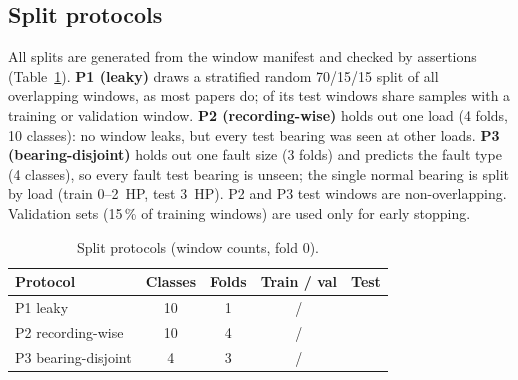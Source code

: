 \documentclass[conference]{IEEEtran}
\begin{document}
\subsection{Split protocols}
All splits are generated from the window manifest and checked by assertions (Table~\ref{tab:splits}).
\textbf{P1 (leaky)} draws a stratified random 70/15/15 split of all overlapping windows, as most papers do;
\NumPOneLeakPct{} of its test windows share samples with a training or validation window. \textbf{P2 (recording-wise)} holds out one
load (4 folds, 10 classes): no window leaks, but every test bearing was seen at other loads. \textbf{P3
(bearing-disjoint)} holds out one fault size (3 folds) and predicts the fault type (4 classes), so every fault test
bearing is unseen; the single normal bearing is split by load (train 0--2~HP, test 3~HP). P2 and P3 test windows are
non-overlapping. Validation sets (15\,\% of training windows) are used only for early stopping.

\begin{table}[t]
\centering
\caption{Split protocols (window counts, fold 0).}
\label{tab:splits}
\begin{tabular}{lcccc}
\toprule
Protocol & Classes & Folds & Train / val & Test \\
\midrule
P1 leaky & 10 & 1 & \NumPOneTrain{} / \NumPOneVal{} & \NumPOneTest{} \\
P2 recording-wise & 10 & 4 & \NumPTwoTrain{} / \NumPTwoVal{} & \NumPTwoTest{} \\
P3 bearing-disjoint & 4 & 3 & \NumPThreeTrain{} / \NumPThreeVal{} & \NumPThreeTest{} \\
\bottomrule
\end{tabular}
\end{table}
\end{document}
